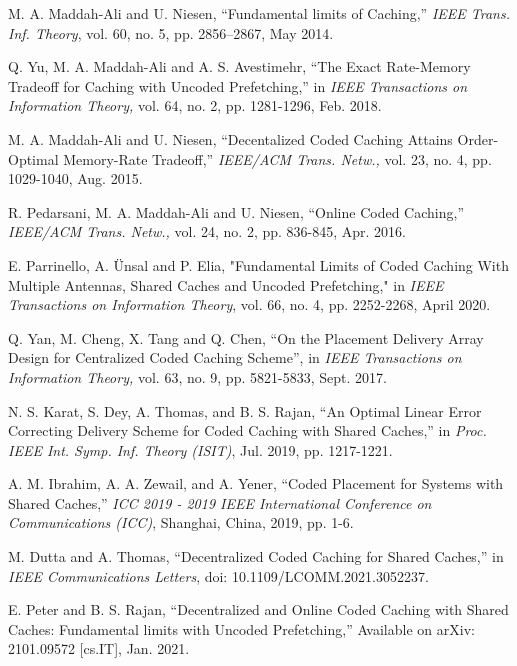 \documentclass[conference,a4paper,10pt]{IEEEtran}
\begin{document}
\begin{thebibliography}{1}

M. A. Maddah-Ali and U. Niesen, \enquote{Fundamental limits of Caching,} \textit{IEEE Trans. Inf. Theory}, vol. 60, no. 5, pp. 2856–2867, May 2014.

Q. Yu, M. A. Maddah-Ali and A. S. Avestimehr, \enquote{The Exact Rate-Memory Tradeoff for Caching with Uncoded Prefetching,} in \textit{IEEE Transactions on Information Theory,} vol. 64, no. 2, pp. 1281-1296, Feb. 2018.

M. A. Maddah-Ali and U. Niesen, \enquote{Decentalized Coded Caching Attains Order-Optimal Memory-Rate Tradeoff,} \textit{IEEE/ACM Trans. Netw.,} vol. 23, no. 4, pp. 1029-1040, Aug. 2015.

R. Pedarsani, M. A. Maddah-Ali and U. Niesen, \enquote{Online Coded Caching,} \textit{IEEE/ACM Trans. Netw.,} vol. 24, no. 2, pp. 836-845, Apr. 2016.


E. Parrinello, A. Ünsal and P. Elia, "Fundamental Limits of Coded Caching With Multiple Antennas, Shared Caches and Uncoded Prefetching," in \textit{IEEE Transactions on Information Theory}, vol. 66, no. 4, pp. 2252-2268, April 2020.


Q. Yan, M. Cheng, X. Tang and Q. Chen, \enquote{On the Placement Delivery Array Design for Centralized Coded Caching Scheme},  in \textit{IEEE Transactions on Information Theory,} vol. 63, no. 9, pp. 5821-5833, Sept. 2017.


N. S. Karat, S. Dey, A. Thomas, and B. S. Rajan, \enquote{An Optimal Linear Error Correcting Delivery Scheme for Coded Caching with Shared Caches,} in \textit{Proc. IEEE Int. Symp. Inf. Theory (ISIT)}, Jul. 2019, pp. 1217-1221.

A. M. Ibrahim, A. A. Zewail, and A. Yener, \enquote{Coded Placement for Systems with Shared Caches,} \textit{ICC 2019 - 2019 IEEE International Conference on Communications (ICC)}, Shanghai, China, 2019, pp. 1-6.

M. Dutta and A. Thomas, \enquote{Decentralized Coded Caching for Shared Caches,} in \textit{IEEE Communications Letters}, doi: 10.1109/LCOMM.2021.3052237.


E. Peter and B. S. Rajan, \enquote{Decentralized and Online Coded Caching with Shared Caches: Fundamental limits with Uncoded Prefetching,} Available on arXiv: 2101.09572 [cs.IT], Jan. 2021.


\end{thebibliography}
\end{document}
